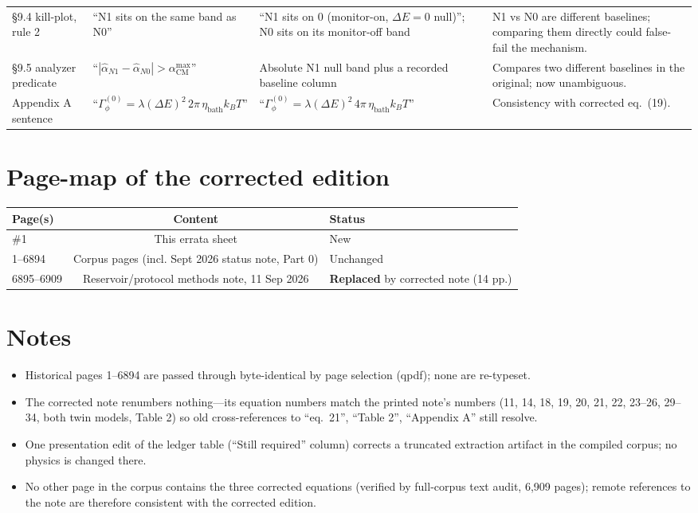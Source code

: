 \documentclass[11pt]{article}
\begin{document}
\begin{longtable}{p{0.9in}p{2.35in}p{2.35in}p{2.35in}}
\S9.4 kill-plot, rule 2 &
``N1 sits on the same band as N0'' &
``N1 sits on 0 (monitor-on, $\Delta E{=}0$ null)''; N0 sits on its monitor-off band &
N1 vs N0 are different baselines; comparing them directly could false-fail the mechanism.\\

\S9.5 analyzer predicate &
``$|\hat\alpha_{N1}-\hat\alpha_{N0}| > \alpha_{\mathrm{CM}}^{\max}$'' &
Absolute N1 null band plus a recorded baseline column &
Compares two different baselines in the original; now unambiguous.\\

Appendix A sentence &
``$\Gamma_\phi^{(0)} = \lambda(\Delta E)^2\, 2\pi\,\eta_{\mathrm{bath}}k_BT$'' &
``$\Gamma_\phi^{(0)} = \lambda(\Delta E)^2\, 4\pi\,\eta_{\mathrm{bath}}k_BT$'' &
Consistency with corrected eq.~(19).\\
\hline
\end{longtable}

\section*{Page-map of the corrected edition}

\begin{center}
\begin{tabular}{lcl}
\textbf{Page(s)} & \textbf{Content} & \textbf{Status}\\
\hline
\#1 & This errata sheet & New\\
1--6894 & Corpus pages (incl. Sept 2026 status note, Part 0) & Unchanged\\
6895--6909 & Reservoir/protocol methods note, 11 Sep 2026 & \textbf{Replaced} by corrected note (14 pp.)\\
\hline
\end{tabular}
\end{center}

\section*{Notes}

\begin{itemize}
\itemsep1pt
\item Historical pages 1--6894 are passed through byte-identical by page selection (qpdf); none are re-typeset.
\item The corrected note renumbers nothing---its equation numbers match the printed note's numbers (11, 14, 18, 19, 20, 21, 22, 23--26, 29--34, both twin models, Table 2) so old cross-references to ``eq.~21'', ``Table 2'', ``Appendix A'' still resolve.
\item One presentation edit of the ledger table (``Still required'' column) corrects a truncated extraction artifact in the compiled corpus; no physics is changed there.
\item No other page in the corpus contains the three corrected equations (verified by full-corpus text audit, 6{,}909 pages); remote references to the note are therefore consistent with the corrected edition.
\end{itemize}
\end{document}

